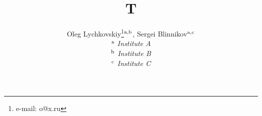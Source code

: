 \documentclass{article}
\begin{document}
\title{T}
\author{Oleg Lychkovskiy\thanks{e-mail: o@x.ru}\hspace*{2mm}$^{\rm a,b}$, Sergei Blinnikov\hspace*{2mm}$^{\rm a,c}$
\\ ${\rm ^a}$ {\small\it Institute A}\\
${\rm ^b}$ {\small\it Institute B}\\
${\rm ^c}$ {\small\it Institute C}}
\maketitle
\end{document}
